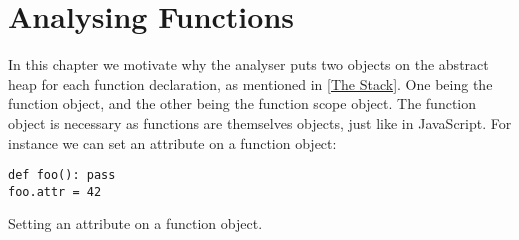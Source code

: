 \chapter{Analysing Functions}
\label{Functions}
In this chapter we motivate why the analyser puts two objects on the abstract heap for each function declaration, as mentioned in \autoref{The Stack}. One being the function object, and the other being the function scope object. The function object is necessary as functions are themselves objects, just like in JavaScript. For instance we can set an attribute on a function object:

\begin{listing}[H]
	\begin{verbatim}
def foo(): pass
foo.attr = 42
	\end{verbatim}
\caption{Setting an attribute on a function object.}
\label{code:FunctionPropertyExample}
\end{listing}




%

